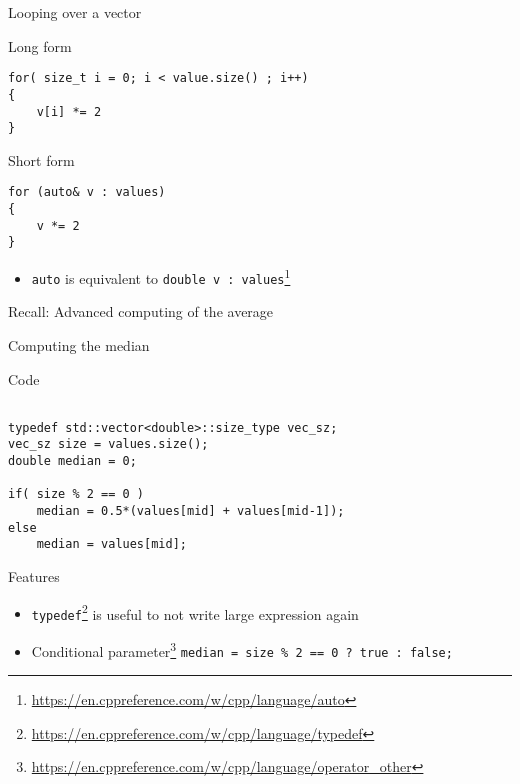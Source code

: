 \documentclass[\classoption]{beamer}
\begin{document}
\begin{frame}[fragile]{Looping over a vector}

\begin{block}{Long form}
\begin{lstlisting}
for( size_t i = 0; i < value.size() ; i++)
{
	v[i] *= 2
}
\end{lstlisting}
\end{block}


\begin{block}{Short form}
\begin{lstlisting}
for (auto& v : values)
{
	v *= 2
}
\end{lstlisting}
\end{block}
\begin{itemize}
\item \lstinline|auto| is equivalent to \lstinline|double v : values|\footnote{\tiny\url{https://en.cppreference.com/w/cpp/language/auto}} 
\end{itemize}

\end{frame}

\begin{frame}{Recall: Advanced computing of the average}



\end{frame}

\begin{frame}[fragile]{Computing the median}

\begin{block}{Code}
\begin{lstlisting}

typedef std::vector<double>::size_type vec_sz;
vec_sz size = values.size();
double median = 0;

if( size % 2 == 0 ) 
	median = 0.5*(values[mid] + values[mid-1]);
else
	median = values[mid];
\end{lstlisting}
\end{block}

\begin{block}{Features}
\begin{itemize}
\item \lstinline|typedef|\footnote{\tiny\url{https://en.cppreference.com/w/cpp/language/typedef}} is useful to not write large expression again
\item Conditional parameter\footnote{\tiny\url{https://en.cppreference.com/w/cpp/language/operator_other}} \lstinline|median = size % 2 == 0 ? true : false; |
\end{itemize}
\end{block}
\end{frame}
\end{document}
